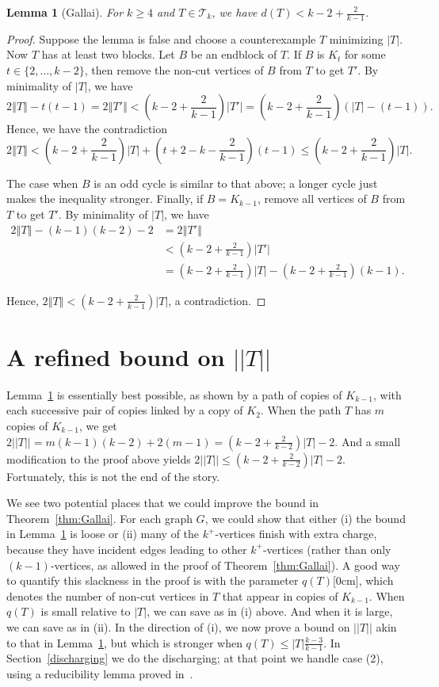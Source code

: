 \documentclass[12pt]{article}
\theoremstyle{plain}
\newtheorem{lem}[thm]{Lemma}
\theoremstyle{definition}
\theoremstyle{remark}
\newcommand{\fancy}[1]{\mathcal{#1}}
\newcommand{\T}{\fancy{T}}
\newcommand{\size}[1]{\left\Vert#1\right\Vert}
\newcommand{\parens}[1]{\left( #1 \right)}
\newcommand{\aside}[1]{\marginnote{\scriptsize{#1}}[0cm]}
\begin{document}
\begin{lem}[Gallai]
\label{BasicGallaiTreeBound}
	For $k \ge 4$ and $T \in \T_k$, we have $d(T) < k-2 + \frac{2}{k-1}$.
\end{lem}
\begin{proof}
	Suppose the lemma is false and choose a counterexample $T$ minimizing $|T|$.  Now $T$ has at least two blocks.  Let $B$ be an endblock of $T$.  If $B$ is $K_t$ for some $t\in \{2,\ldots, k-2\}$, then remove the non-cut vertices of $B$ from $T$ to get $T'$.  By minimality of $|T|$, we have 
	\[2\size{T} - t(t-1) = 2\size{T'} < \parens{k-2 + \frac{2}{k-1}}|T'| = \parens{k-2 + \frac{2}{k-1}}\parens{|T|-(t-1)}.\]
	Hence, we have the contradiction
	\[2\size{T} < \parens{k-2 + \frac{2}{k-1}}|T| + (t+2 -k - \frac{2}{k-1})(t-1) \le \parens{k-2 + \frac{2}{k-1}}|T|.\]
	
	The case when $B$ is an odd cycle is similar to that above; a longer cycle just makes the inequality stronger.  Finally, if $B = K_{k-1}$, remove all vertices of $B$ from $T$ to get $T'$. By minimality of $|T|$, we have 
	\begin{align*}
	  2\size{T} - (k-1)(k-2) - 2 &= 2\size{T'}\\
	  &< \parens{k-2 + \frac{2}{k-1}}|T'|\\
	  &= \parens{k-2 + \frac{2}{k-1}}|T| - \parens{k-2 + \frac{2}{k-1}}(k-1).
	\end{align*}

	Hence, $2\size{T} < \parens{k-2 + \frac{2}{k-1}}|T|$, a contradiction.
\end{proof}

\section{A refined bound on $||T||$}
Lemma~\ref{BasicGallaiTreeBound} is essentially best possible, as shown by a
path of copies of $K_{k-1}$, with each successive pair of copies linked by a
copy of $K_2$.  When the path $T$ has $m$ copies of $K_{k-1}$, we get
$2||T||=m(k-1)(k-2)+2(m-1) = (k-2+\frac2{k-2})|T|-2$.  And a small modification
to the proof above yields $2||T|| \le (k-2+\frac2{k-2})|T|-2$. 
Fortunately, this is not the end of the story.

We see two potential places that we could improve the bound in
Theorem~\ref{thm:Gallai}. For each graph $G$, we could show that either (i) the
bound in Lemma~\ref{BasicGallaiTreeBound} is loose or (ii) many of the
$k^+$-vertices finish with extra charge, because they have incident edges
leading to other $k^+$-vertices (rather than only $(k-1)$-vertices, as allowed
in the proof of Theorem~\ref{thm:Gallai}).  A good way to quantify this
slackness in the proof is with the parameter $q(T)$\aside{$q(T)$}, which
denotes the number of non-cut vertices in $T$ that appear in copies of
$K_{k-1}$.  When $q(T)$ is small relative to $|T|$, we can save as in (i)
above.  And when it is large, we can save as in (ii).  In the direction of (i),
we now prove a bound on $||T||$ akin to that in
Lemma~\ref{BasicGallaiTreeBound}, but which is stronger when
$q(T)\le|T|\frac{k-3}{k-1}$.  In Section~\ref{discharging} 
we do the discharging; at that point we handle case (2),
using a reducibility lemma proved in~\cite{OreVizing}. 
\end{document}
